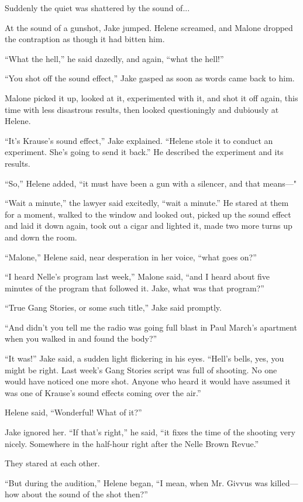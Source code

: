 \documentclass{novel}
\begin{document}
Suddenly the quiet was shattered by the sound of...

At the sound of a gunshot, Jake jumped. Helene screamed, and Malone dropped the contraption as though it had bitten him.

“What the hell,” he said dazedly, and again, “what the hell!”

“You shot off the sound effect,” Jake gasped as soon as words came back to him.

Malone picked it up, looked at it, experimented with it, and shot it off again, this time with less disastrous results, then looked questioningly and dubiously at Helene.

“It’s Krause’s sound effect,” Jake explained. “Helene stole it to conduct an experiment. She’s going to send it back.” He described the experiment and its results.

“So,” Helene added, “it must have been a gun with a silencer, and that means—"

“Wait a minute,” the lawyer said excitedly, “wait a minute.” He stared at them for a moment, walked to the window and looked out, picked up the sound effect and laid it down again, took out a cigar and lighted it, made two more turns up and down the room.

“Malone,” Helene said, near desperation in her voice, “what goes on?”

“I heard Nelle’s program last week,” Malone said, “and I heard about five minutes of the program that followed it. Jake, what was that program?”

“True Gang Stories, or some such title,” Jake said promptly.

“And didn’t you tell me the radio was going full blast in Paul March’s apartment when you walked in and found the body?”

“It was!” Jake said, a sudden light flickering in his eyes. “Hell’s bells, yes, you might be right. Last week’s Gang Stories script was full of shooting. No one would have noticed one more shot. Anyone who heard it would have assumed it was one of Krause’s sound effects coming over the air.”

Helene said, “Wonderful! What of it?”

Jake ignored her. “If that’s right,” he said, “it fixes the time of the shooting very nicely. Somewhere in the half-hour right after the Nelle Brown Revue.”

They stared at each other.

“But during the audition,” Helene began, “I mean, when Mr. Givvus was killed—how about the sound of the shot then?”
\end{document}
